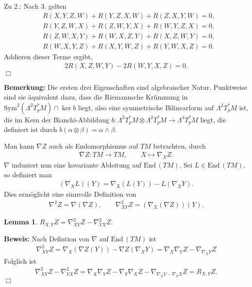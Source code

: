 \documentclass[12pt,a4paper]{article}
\def\End{\mathrm{End}\,}
\def\Sym{\mathrm{Sym}}
\newtheorem{Lemma}{Lemma}[section]
\def\proof{\noindent\textbf{Beweis:}\quad}
\def\qed{\quad\hfill\ensuremath{\Box}}
\begin{document}
Zu 2.: Nach 3. gelten
\begin{align*}
&R(X,Y,Z,W) + R(Y,Z,X,W) + R(Z,X,Y,W) = 0,\\
&R(Y,Z,W,X) + R(Z,W,Y,X) + R(W,Y,Z,X) = 0,\\
&R(Z,W,X,Y) + R(W,X,Z,Y) + R(X,Z,W,Y) = 0,\\
&R(W,X,Y,Z) + R(X,Y,W,Z) + R(Y,W,X,Z) = 0.
\end{align*}
Addieren dieser Terme ergibt,
\begin{align*}
2R(X,Z,W,Y) - 2R(W,Y,X,Z) = 0.
\end{align*}
\qed

\bigskip

{\bf Bemerkung:} Die ersten drei Eigenschaften sind algebraischer Natur. Punktweise sind sie
\"aquivalent dazu, dass die Riemannsche Kr\"ummung in
$
\Sym^2(\Lambda^2 T^*_pM) \cap \ker b
$
liegt, also eine symmetrische Bilinearform auf $\Lambda^2T^*_pM$ ist, die im Kern der
Bianchi-Abbildung $b: \Lambda^2T^*_pM \otimes \Lambda^2T^*_pM \rightarrow \Lambda^4T^*_pM$
liegt, die definiert ist durch $b(\alpha \otimes \beta ) = \alpha \wedge \beta$.

\bigskip

Man kann $\nabla Z$ auch als Endomorphismus auf $TM$ betrachten, durch
\begin{align*}
\nabla Z : TM\to TM,\qquad X\mapsto \nabla_XZ.
\end{align*}
$\nabla$ induziert nun eine kovariante Ableitung auf $\End(TM)$.
Sei $L\in \End(TM)$, so definiert man
\begin{align*}
(\nabla_X L)(Y) = \nabla_X (L(Y)) - L(\nabla_X Y).
\end{align*}
Dies erm\"oglicht eine sinnvolle Definition von
\begin{align*}
\nabla^2 Z = \nabla (\nabla Z),\qquad \nabla_{XY}^2 Z = (\nabla_X(\nabla Z))(Y).
\end{align*}

\bigskip

\begin{Lemma}
$R_{X,Y}Z = \nabla_{XY}^2 Z - \nabla_{YX}^2 Z$.
\end{Lemma}

\proof
Nach Defintion von $\nabla$ auf $\End(TM)$ ist
\begin{align*}
\nabla_{XY}^2 Z = \nabla_X(\nabla Z(Y)) - \nabla Z(\nabla_X Y) = 
\nabla_X\nabla_Y Z - \nabla_{\nabla_X Y}Z
\end{align*}
Folglich ist
\begin{align*}
\nabla_{XY}^2 Z - \nabla_{YX}^2 Z = 
\nabla_X\nabla_Y Z - \nabla_Y\nabla_X Z - \nabla_{\nabla_X Y - \nabla_Y X} Z =
R_{X,Y}Z.
\end{align*}
\qed
\end{document}
